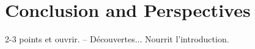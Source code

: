 \chapter{Conclusion and Perspectives}
2-3 points et ouvrir.
-- Découvertes...
Nourrit l'introduction.